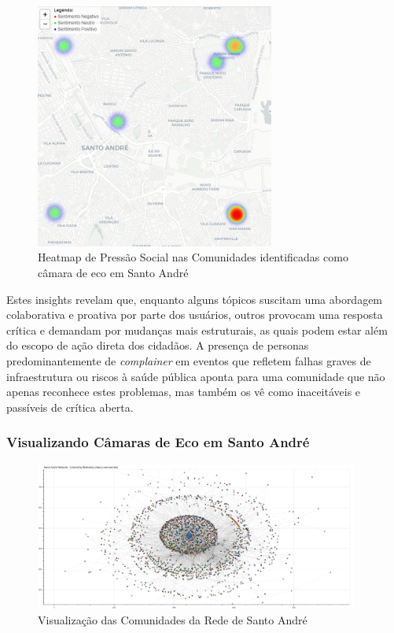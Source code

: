 \begin{figure}[htb]
	\centering
	\includegraphics[width=0.7\textwidth]{images/echo_chamber_santo_andre_heatmap.PNG}
	\caption{Heatmap de Pressão Social nas Comunidades identificadas como câmara de eco em Santo André}
	\label{fig:echo_chamber_santo_andre_heatmap}
\end{figure}

Estes insights revelam que, enquanto alguns tópicos suscitam uma abordagem colaborativa e proativa por parte dos usuários, outros provocam uma resposta crítica e demandam por mudanças mais estruturais, as quais podem estar além do escopo de ação direta dos cidadãos. A presença de personas predominantemente de \textit{complainer} em eventos que refletem falhas graves de infraestrutura ou riscos à saúde pública aponta para uma comunidade que não apenas reconhece estes problemas, mas também os vê como inaceitáveis e passíveis de crítica aberta.

\subsubsection*{Visualizando Câmaras de Eco em Santo André}

\begin{figure}[htb]
	\centering
	\includegraphics[width=0.95\textwidth]{images/network_community_santo_andre.png}
	\caption{Visualização das Comunidades da Rede de Santo André}
	\label{fig:network_community_santo_andre}
\end{figure}

